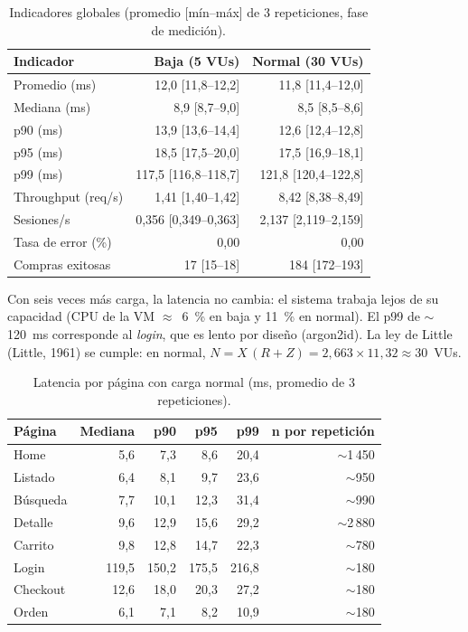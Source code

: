 \documentclass[11pt,a4paper]{article}
\begin{document}
\begin{table}[H]
\centering\small
\begin{tabular}{@{}lrr@{}}
\toprule
Indicador & Baja (5 VUs) & Normal (30 VUs) \\
\midrule
Promedio (ms)      & 12,0 [11,8--12,2] & 11,8 [11,4--12,0] \\
Mediana (ms)       & 8,9 [8,7--9,0]    & 8,5 [8,5--8,6] \\
p90 (ms)           & 13,9 [13,6--14,4] & 12,6 [12,4--12,8] \\
p95 (ms)           & 18,5 [17,5--20,0] & 17,5 [16,9--18,1] \\
p99 (ms)           & 117,5 [116,8--118,7] & 121,8 [120,4--122,8] \\
Throughput (req/s) & 1,41 [1,40--1,42] & 8,42 [8,38--8,49] \\
Sesiones/s         & 0,356 [0,349--0,363] & 2,137 [2,119--2,159] \\
Tasa de error (\%) & 0,00 & 0,00 \\
Compras exitosas   & 17 [15--18] & 184 [172--193] \\
\bottomrule
\end{tabular}
\caption{Indicadores globales (promedio [mín--máx] de 3 repeticiones, fase de medición).}
\label{tab:baja-normal}
\end{table}

Con seis veces más carga, la latencia no cambia: el sistema trabaja lejos de su
capacidad (CPU de la VM $\approx$~6~\% en baja y 11~\% en normal). El p99 de
$\sim$120~ms corresponde al \emph{login}, que es lento por diseño (argon2id). La
ley de Little (Little, 1961) se cumple: en normal, $N = X\,(R+Z) = 2{,}663 \times 11{,}32
\approx 30$~VUs.

\begin{table}[H]
\centering\small
\begin{tabular}{@{}lrrrrr@{}}
\toprule
Página & Mediana & p90 & p95 & p99 & n por repetición \\
\midrule
Home      & 5,6 & 7,3 & 8,6 & 20,4 & $\sim$1\,450 \\
Listado   & 6,4 & 8,1 & 9,7 & 23,6 & $\sim$950 \\
Búsqueda  & 7,7 & 10,1 & 12,3 & 31,4 & $\sim$990 \\
Detalle   & 9,6 & 12,9 & 15,6 & 29,2 & $\sim$2\,880 \\
Carrito   & 9,8 & 12,8 & 14,7 & 22,3 & $\sim$780 \\
Login     & 119,5 & 150,2 & 175,5 & 216,8 & $\sim$180 \\
Checkout  & 12,6 & 18,0 & 20,3 & 27,2 & $\sim$180 \\
Orden     & 6,1 & 7,1 & 8,2 & 10,9 & $\sim$180 \\
\bottomrule
\end{tabular}
\caption{Latencia por página con carga normal (ms, promedio de 3 repeticiones).}
\end{table}
\end{document}
